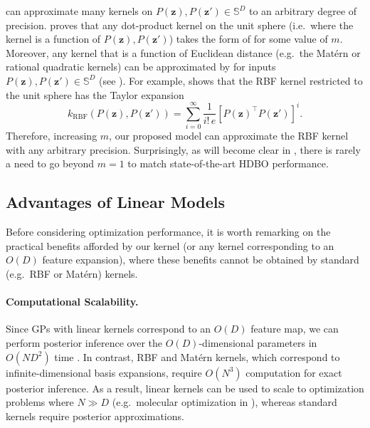 \documentclass[twoside]{article}
\theoremstyle{plain}
\theoremstyle{definition}
\begin{document}
 can approximate many kernels on $P(\mathbf z), P(\mathbf z') \in \mathbb{S}^D$ to an arbitrary degree of precision.
\citet{schoenberg1942positive} proves that any dot-product kernel on the unit sphere (i.e.\ where the kernel is a function of $P(\mathbf z), P(\mathbf z')$) takes the form of  for some value of $m$.
Moreover, any kernel that is a function of Euclidean distance (e.g.\ the Mat\'ern or rational quadratic kernels) can be approximated by  for inputs $P\left(\mathbf{z}\right), P\left(\mathbf{z'}\right) \in \mathbb{S}^{D}$ (see ).
For example,  shows that the RBF kernel 
restricted to the unit sphere has the Taylor expansion
\begin{equation} \label{eq:taylor-exp}
    k_\textrm{RBF}\left(P\left(\mathbf{z}\right), P\left(\mathbf{z'}\right)\right) = \sum_{i=0}^{\infty} \frac{1}{i!\,e} \left[P\left(\mathbf{z}\right)^{\top} P\left(\mathbf{z'}\right)\right]^i.
\end{equation}
Therefore, increasing $m$, our proposed model can approximate the RBF kernel with any arbitrary precision.
Surprisingly, as will become clear in , there is rarely a need to go beyond $m=1$ to match state-of-the-art HDBO performance.

\subsection{Advantages of Linear Models}
Before considering optimization performance, it is worth remarking on the practical benefits afforded by our kernel (or any kernel corresponding to an $O(D)$ feature expansion), where these benefits cannot be obtained by standard (e.g.\ RBF or Mat\'ern) kernels.

\paragraph{Computational Scalability.}
Since GPs with linear kernels correspond to an $O(D)$ feature map,
we can perform posterior inference over the $O(D)$-dimensional parameters
in $O(ND^2)$ time \citep{williams2006gaussian}.
In contrast, RBF and Mat\'ern kernels, which correspond to infinite-dimensional basis expansions,
require $O(N^3)$ computation for exact posterior inference.
As a result, linear kernels can be used to scale to optimization problems where $N \gg D$ (e.g.\ molecular optimization in ), whereas standard kernels require posterior approximations.
\end{document}
